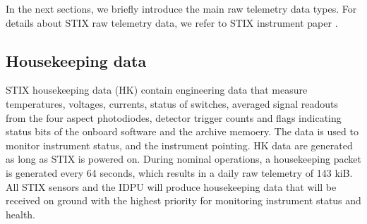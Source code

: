 \documentclass{aa}
\begin{document}
In the next sections, we briefly introduce the main raw telemetry data types.
For details about STIX raw telemetry data, we refer to STIX instrument paper \cite{StixInstrument}.

\subsection{Housekeeping data}
STIX housekeeping data (HK) contain engineering  data that measure temperatures, voltages, currents, status of switches,
averaged signal readouts from the four aspect photodiodes, detector trigger counts and  flags indicating
status bits of the onboard software and the archive memoery.
The data is used to monitor instrument status, and the instrument pointing.
HK data are generated as long as STIX is powered on.
During nominal operations, a housekeeping packet is generated every 64 seconds, which results in a daily raw telemetry of  143 kiB.
All STIX sensors and the IDPU will produce housekeeping data that will be received on ground with the highest priority
for monitoring instrument status and health.
\end{document}
